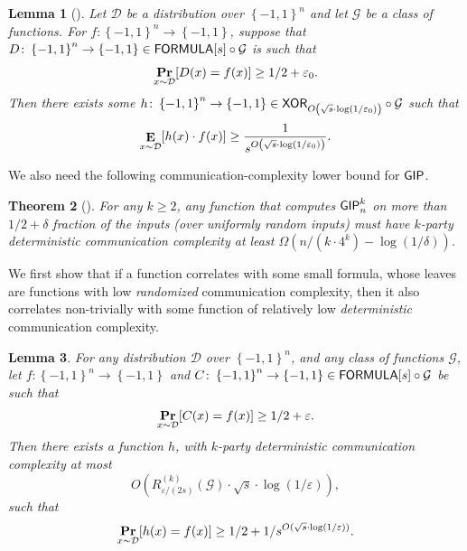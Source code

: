 \documentclass[10pt,a4paper]{article}
\newtheorem{theorem}{Theorem}
\newtheorem{lemma}[theorem]{Lemma}
\DeclareMathOperator*\Exp{{\bf E}}
\DeclareMathOperator*\Prob{{\bf Pr}}
\newcommand{\boolpm}{\left\{-1,1\right\}}
\newcommand{\FORMULA}{{\sf FORMULA}}
\newcommand{\XOR}{{\sf XOR}}
\newcommand{\GIP}{{\sf GIP}}
\begin{document}
	\begin{lemma}[\cite{Tal16}]\label{lem:lb-Tal-2}
	    Let $\mathcal{D}$ be a distribution over $\boolpm^n$ and let $\mathcal{G}$ be a class of functions. For $f\colon\boolpm^n\to\boolpm$, suppose that $D\colon\boolpm^n\to\boolpm\in \FORMULA[s]\circ\mathcal{G}$ is such that 
	    \[
	        \Prob_{x\sim\mathcal{D}}[D(x)=f(x)]\geq 1/2+\varepsilon_0.
	    \]
	    Then there exists some $h\colon\boolpm^n\to\boolpm\in \XOR_{O\left(\sqrt{s}\cdot\log(1/\varepsilon_0)\right)}\circ \mathcal{G}$ such that
	    \[
	        \Exp_{x\sim\mathcal{D}}[h(x)\cdot f(x)]\geq \frac{1}{s^{O\left(\sqrt{s}\cdot\log(1/\varepsilon_0)\right)}}.
	    \]
	\end{lemma}
    
    We also need the following communication-complexity lower bound for $\GIP$.
    
    \begin{theorem}[{\cite[Theorem 2]{BNS92}}]\label{thm:lb-GIP-bound}
        For any $k\geq 2$, any function that computes $\GIP_{n}^{k}$ on more than $1/2+\delta$ fraction of the inputs (over uniformly random inputs) must have $k$-party deterministic communication complexity at least $\Omega \! \left(n/(k \cdot 4^k) - \log(1/\delta)\right)$.
    \end{theorem}
    
    We first show that if a function correlates with some small formula, whose leaves are functions with low \emph{randomized} communication complexity, then it also correlates non-trivially with some function of relatively low \emph{deterministic} communication complexity.
    
    \begin{lemma}\label{thm:lb-proof-1}
        For any distribution $\mathcal{D}$ over $\boolpm^n$, and any class of functions $\mathcal{G}$, let $f\colon\boolpm^n\to\boolpm$ and $C\colon\boolpm^n\to\boolpm\in \FORMULA[s]\circ\mathcal{G}$ be such that 
	    \[
	        \Prob_{x\sim\mathcal{D}}[C(x)=f(x)]\geq 1/2+\varepsilon.
	    \]
	    Then there exists a function $h$, with $k$-party deterministic communication complexity at most
	    \[
	        O\left(R^{(k)}_{\varepsilon/(2s)}(\mathcal{G})\cdot\sqrt{s}\cdot\log(1/\varepsilon)\right),
	    \]
	    such that
	    \[
	        \Prob_{x\sim\mathcal{D}}[h(x)=f(x)]\geq 1/2+1/s^{O(\sqrt{s}\cdot\log(1/\varepsilon))}.
	    \]
    \end{lemma}
    
\end{document}
